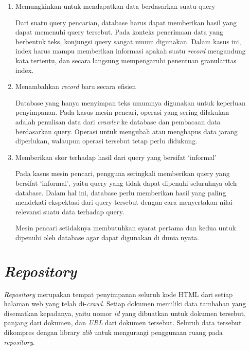 \begin{enumerate}
  \item{Memungkinkan untuk mendapatkan data berdasarkan suatu query}

  Dari suatu query pencarian, database harus dapat memberikan hasil yang dapat
  memenuhi query tersebut. Pada konteks penerimaan data yang berbentuk teks,
  konjungsi query sangat umum digunakan. Dalam kasus ini, index harus mampu
  memberikan informasi apakah suatu \emph{record} mengandung kata tertentu, dan
  secara langsung mempengaruhi penentuan granularitas index.

  \item{Menambahkan \emph{record} baru secara efisien}

  Database yang hanya menyimpan teks umumnya digunakan untuk keperluan
  penyimpanan. Pada kasus mesin pencari, operasi yang sering dilakukan adalah
  penulisan data dari \emph{crawler} ke database dan pembacaan data berdasarkan
  query. Operasi untuk mengubah atau menghapus data jarang diperlukan, walaupun
  operasi tersebut tetap perlu didukung.

  \item{Memberikan skor terhadap hasil dari query yang bersifat `informal'}

  Pada kasus mesin pencari, pengguna seringkali memberikan query yang bersifat
  `informal', yaitu query yang tidak dapat dipenuhi seluruhnya oleh database.
  Dalam hal ini, database perlu memberikan hasil yang paling mendekati
  ekspektasi dari query tersebut dengan cara menyertakan nilai relevansi suatu
  data terhadap query.

  Mesin pencari setidaknya membutuhkan syarat pertama dan kedua untuk dipenuhi
  oleh database agar dapat digunakan di dunia nyata.

\end{enumerate}

\section{\emph{Repository}}

\emph{Repository} merupakan tempat penyimpanan seluruh kode HTML dari setiap
halaman web yang telah di-\emph{crawl}. Setiap dokumen memiliki data tambahan
yang disematkan kepadanya, yaitu nomor \emph{id} yang dibuatkan untuk dokumen
tersebut, panjang dari dokumen, dan \emph{URL} dari dokumen tersebut. Seluruh
data tersebut dikompres dengan library \emph{zlib} untuk mengurangi penggunaan
ruang pada \emph{repository}.

